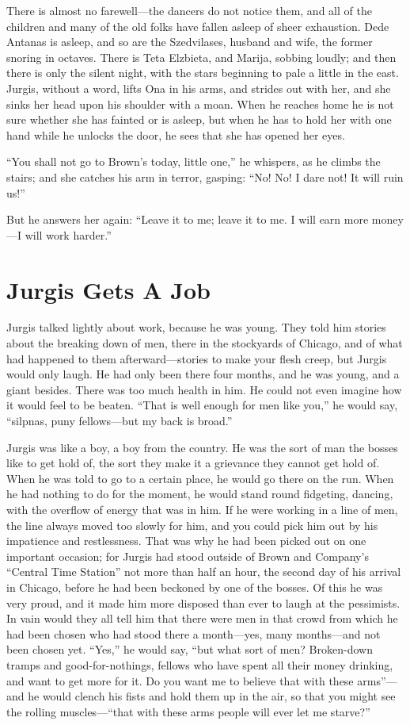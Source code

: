 \documentclass[
]{book}
\begin{document}
There is almost no farewell---the dancers do not notice them, and all of the children and many of the old folks have fallen asleep of sheer exhaustion. Dede Antanas is asleep, and so are the Szedvilases, husband and wife, the former snoring in octaves. There is Teta Elzbieta, and Marija, sobbing loudly; and then there is only the silent night, with the stars beginning to pale a little in the east. Jurgis, without a word, lifts Ona in his arms, and strides out with her, and she sinks her head upon his shoulder with a moan. When he reaches home he is not sure whether she has fainted or is asleep, but when he has to hold her with one hand while he unlocks the door, he sees that she has opened her eyes.

``You shall not go to Brown's today, little one,'' he whispers, as he climbs the stairs; and she catches his arm in terror, gasping: ``No! No! I dare not! It will ruin us!''

But he answers her again: ``Leave it to me; leave it to me. I will earn more money---I will work harder.''

\chapter{Jurgis Gets A Job}\label{jurgis-gets-a-job}

Jurgis talked lightly about work, because he was young. They told him stories about the breaking down of men, there in the stockyards of Chicago, and of what had happened to them afterward---stories to make your flesh creep, but Jurgis would only laugh. He had only been there four months, and he was young, and a giant besides. There was too much health in him. He could not even imagine how it would feel to be beaten. ``That is well enough for men like you,'' he would say, ``silpnas, puny fellows---but my back is broad.''

Jurgis was like a boy, a boy from the country. He was the sort of man the bosses like to get hold of, the sort they make it a grievance they cannot get hold of. When he was told to go to a certain place, he would go there on the run. When he had nothing to do for the moment, he would stand round fidgeting, dancing, with the overflow of energy that was in him. If he were working in a line of men, the line always moved too slowly for him, and you could pick him out by his impatience and restlessness. That was why he had been picked out on one important occasion; for Jurgis had stood outside of Brown and Company's ``Central Time Station'' not more than half an hour, the second day of his arrival in Chicago, before he had been beckoned by one of the bosses. Of this he was very proud, and it made him more disposed than ever to laugh at the pessimists. In vain would they all tell him that there were men in that crowd from which he had been chosen who had stood there a month---yes, many months---and not been chosen yet. ``Yes,'' he would say, ``but what sort of men? Broken-down tramps and good-for-nothings, fellows who have spent all their money drinking, and want to get more for it. Do you want me to believe that with these arms''---and he would clench his fists and hold them up in the air, so that you might see the rolling muscles---``that with these arms people will ever let me starve?''
\end{document}
